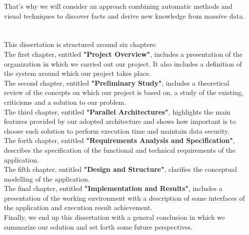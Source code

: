 That's why we will consider an approach combining automatic methods and visual techniques to discover facts and derive new knowledge from massive data.\\
~\\ ~\\
This dissertation is structured around six chapters:\\

The first chapter, entitled \textbf{"Project Overview"}, includes a presentation of the organization in which we carried out our project. It also includes a definition of the system around which our project takes place.\\

The second chapter, entitled \textbf{"Preliminary Study"}, includes a theoretical review of the concepts on which our project is based on, a study of the existing, criticisms and a solution to our problem.\\

The third chapter, entitled \textbf{"Parallel Architectures"}, highlights the main features provided by our adopted architecture and shows how important is to choose such solution to perform execution time and maintain data security.\\

The forth chapter, entitled \textbf{"Requirements Analysis and Specification"}, describes the specification of the functional and technical requirements of the application.\\

The fifth chapter, entitled \textbf{"Design and Structure"}, clarifies the conceptual modelling of the application.\\

The final chapter, entitled \textbf{"Implementation and Results"}, includes a presentation of the working environment with a description of some interfaces of the application and execution result achievement.\\

Finally, we end up this dissertation with a general conclusion in which we summarize our solution and set forth some future perspectives.

